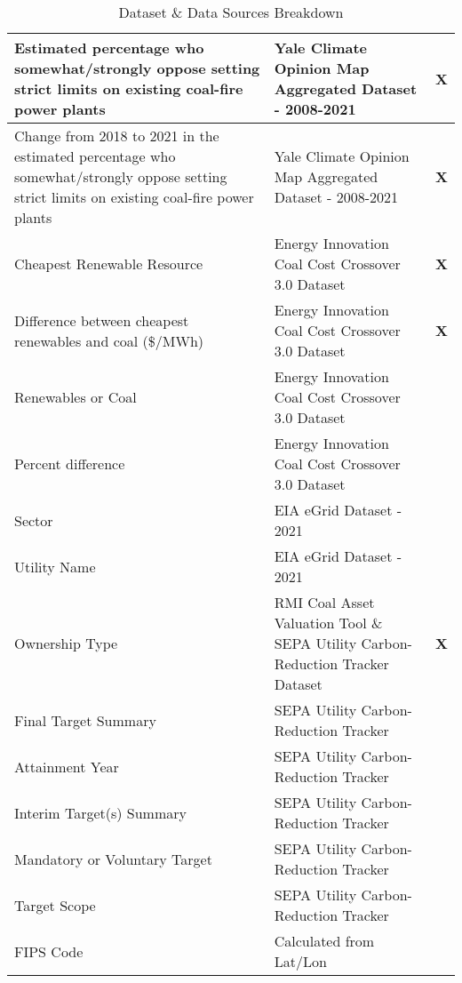 \begin{table}[H]
\begin{adjustbox}{width=\textwidth}
\begin{tabular}{|l | l | l |}
        \midrule
        Estimated percentage who somewhat/strongly oppose setting strict limits on existing coal-fire power plants & Yale Climate Opinion Map Aggregated Dataset - 2008-2021 & \textbf{X} \\
        \midrule
        Change from 2018 to 2021 in the estimated percentage who somewhat/strongly oppose setting strict limits on existing coal-fire power plants & Yale Climate Opinion Map Aggregated Dataset - 2008-2021 & \textbf{X} \\
        \midrule
        Cheapest Renewable Resource & Energy Innovation Coal Cost Crossover 3.0 Dataset & \textbf{X} \\
        \midrule
        Difference between cheapest renewables and coal (\$/MWh) & Energy Innovation Coal Cost Crossover 3.0 Dataset & \textbf{X} \\
        \midrule
        Renewables or Coal & Energy Innovation Coal Cost Crossover 3.0 Dataset & \\
        \midrule
        Percent difference & Energy Innovation Coal Cost Crossover 3.0 Dataset & \\
        \midrule
        Sector & EIA eGrid Dataset - 2021 & \\
        \midrule
        Utility Name & EIA eGrid Dataset - 2021 & \ \\
        \midrule
        Ownership Type & RMI Coal Asset Valuation Tool \& SEPA Utility Carbon-Reduction Tracker Dataset & \textbf{X} \\
        \midrule
        Final Target Summary & SEPA Utility Carbon-Reduction Tracker & \\
        \midrule
        Attainment Year & SEPA Utility Carbon-Reduction Tracker & \\
        \midrule
        Interim Target(s) Summary & SEPA Utility Carbon-Reduction Tracker & \\
        \midrule
        Mandatory or Voluntary Target & SEPA Utility Carbon-Reduction Tracker & \\
        \midrule
        Target Scope & SEPA Utility Carbon-Reduction Tracker & \\
        \midrule
        FIPS Code & Calculated from Lat/Lon\\
        \bottomrule
      \end{tabular}
    \end{adjustbox}
    \caption{Dataset \& Data Sources Breakdown}
  \end{table}



